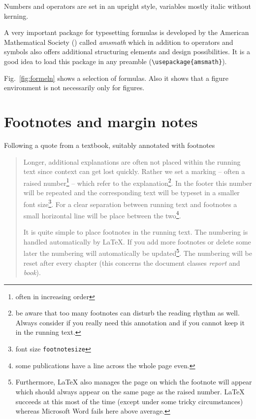 \documentclass[11pt, a4paper]{article}
\newcommand{\ltx}{\LaTeX}
\let\oldmarginpar\marginpar
\renewcommand{\marginpar}[1]{\oldmarginpar{\textit{#1}}}
\begin{document}
Numbers and operators are set in an upright style, variables mostly italic without kerning.

A very important package for typesetting formulas is developed by the American Mathematical Society (\AmS) called \textit{amsmath} which in addition to operators and symbols also offers additional structuring elements and design possibilities. It is a good idea to load this package in any preamble (\verb+\usepackage{amsmath}+).

Fig.~\ref{fig:formeln} shows a selection of formulas. Also it shows that a figure environment is not necessarily only for figures.

\clearpage %

\section{Footnotes and margin notes}

Following a quote from a textbook, suitably annotated with footnotes\marginpar{Footnotes}

\begin{quote}
Longer, additional explanations are often not placed within the running text since context can get lost quickly. Rather we set a marking -- often a raised number\footnote{often in increasing order} -- which refer to the explanation\footnote{be aware that too many footnotes can disturb the reading rhythm as well. Always consider if you really need this annotation and if you cannot keep it in the running text.}. In the footer this number will be repeated and the corresponding text will be typeset in a smaller font size\footnote{font size \texttt{footnotesize}}. For a clear separation between running text and footnotes a small horizontal line will be place between the two\footnote{some publications have a line across the whole page even.}.

It is quite simple to place footnotes in the running text. The numbering is handled automatically by \ltx{}. If you add more footnotes or delete some later the numbering will automatically be updated\footnote{Furthermore, \ltx{} also manages the page on which the footnote will appear which should always appear on the same page as the raised number. \ltx{} succeeds at this most of the time (except under some tricky circumstances) whereas Microsoft Word fails here above average.}. The numbering will be reset after every chapter (this concerns the document classes \textit{report} and \textit{book}). 

\end{quote}
\end{document}
